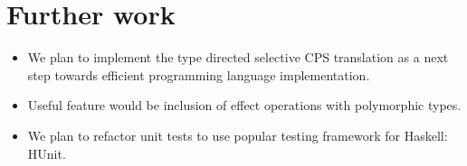\documentclass[a4paper]{article}
\begin{document}
\section{Further work}
\begin{itemize}
  \item We plan to implement the type directed selective CPS translation \cite{leijen2017type}
        as a next step towards efficient programming language implementation.
  \item Useful feature would be inclusion of effect operations with polymorphic types.
  \item We plan to refactor unit tests to use popular testing framework for Haskell: HUnit.
\end{itemize}




\end{document}
